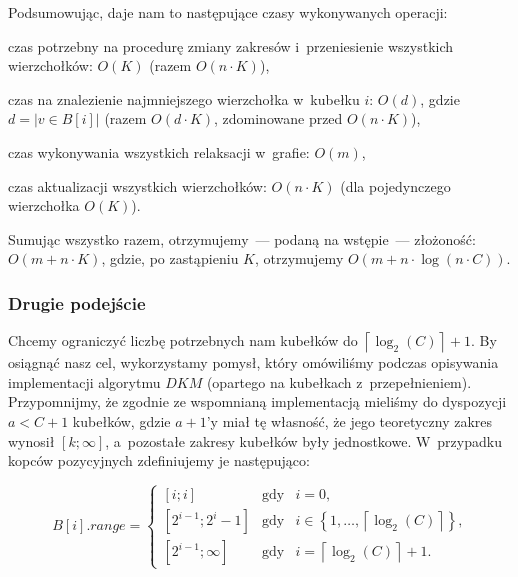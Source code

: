 Podsumowując, daje nam to następujące czasy wykonywanych operacji:

\begin{myitemize}
	\item czas potrzebny na procedurę zmiany zakresów i~przeniesienie wszystkich wierzchołków: $O \left( K \right)$ (razem $O \left( n \cdot K \right)$),
	\item czas na znalezienie najmniejszego wierzchołka w~kubełku $i$: $O \left( d \right)$, gdzie $d = \left| v \in B \left[ i\right] \right|$ (razem $O \left( d \cdot K \right)$, zdominowane przed $O \left( n \cdot K \right)$),
	\item czas wykonywania wszystkich relaksacji w~grafie: $O \left( m \right)$,
	\item czas aktualizacji wszystkich wierzchołków: $O \left( n \cdot K \right)$ (dla pojedynczego wierzchołka $O \left( K\right)$).
\end{myitemize}

Sumując wszystko razem, otrzymujemy~--- podaną na wstępie~--- złożoność: $O \left( m + n \cdot K \right)$, gdzie, po zastąpieniu $K$, otrzymujemy $O \left( m + n \cdot \log \left( n \cdot C \right) \right)$.


\subsubsection{Drugie podejście}


Chcemy ograniczyć liczbę potrzebnych nam kubełków do $\left \lceil \log_{2} \left( C \right) \right \rceil + 1$.
By osiągnąć nasz cel, wykorzystamy pomysł, który omówiliśmy podczas opisywania implementacji algorytmu $DKM$ (opartego na kubełkach z~przepełnieniem).
Przypomnijmy, że zgodnie ze wspomnianą implementacją mieliśmy do dyspozycji $a < C + 1$ kubełków, gdzie $a + 1$'y miał tę własność, że jego teoretyczny zakres wynosił $\left[ k ; \infty \right]$, a~pozostałe zakresy kubełków były jednostkowe.
W~przypadku kopców pozycyjnych zdefiniujemy je następująco:


\begin{equation}
	B \left[ i \right].range = \left\{
		\begin{matrix}
			\left[ i; i \right ]& \textrm{gdy} & i = 0\textrm{,} \\ 
			\left[ 2^{i-1} ; 2^{i} - 1 \right ]& \textrm{gdy} & i \in \left\{ 1, \dots, \left \lceil \log_{2} \left( C \right) \right \rceil \right\}\textrm{,} \\
			\left[ 2^{i-1} ; \infty \right ]& \textrm{gdy} & i = \left \lceil \log_{2} \left( C \right) \right \rceil + 1\textrm{.}
		\end{matrix}
	\right.
\end{equation}

